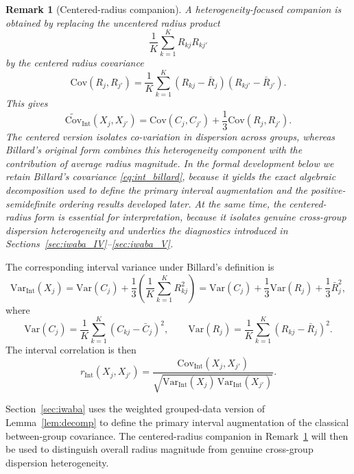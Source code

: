 \documentclass[preprint, times, 12pt, authoryear]{elsarticle}
\newtheorem{remark}{Remark}
\begin{document}
\begin{remark}[Centered-radius companion]\label{rem:routeB}
	A heterogeneity-focused companion is obtained by replacing the uncentered radius product
	\[
	\frac{1}{K}\sum_{k=1}^K R_{kj}R_{kj'}
	\]
	by the centered radius covariance
	\[
	\mathrm{Cov}(R_j,R_{j'})
	=
	\frac{1}{K}\sum_{k=1}^K (R_{kj}-\bar R_j)(R_{kj'}-\bar R_{j'}).
	\]
	This gives
	\begin{equation}\label{eq:int_centered_alt}
		\widetilde{\mathrm{Cov}}_{\mathrm{Int}}(X_j,X_{j'})
		=
		\mathrm{Cov}(C_j,C_{j'})
		+
		\frac{1}{3}\mathrm{Cov}(R_j,R_{j'}).
	\end{equation}
	The centered version isolates co-variation in dispersion across groups, whereas Billard's original form combines this heterogeneity component with the contribution of average radius magnitude. In the formal development below we retain Billard's covariance \eqref{eq:int_billard}, because it yields the exact algebraic decomposition used to define the primary interval augmentation and the positive-semidefinite ordering results developed later. At the same time, the centered-radius form is essential for interpretation, because it isolates genuine cross-group dispersion heterogeneity and underlies the diagnostics introduced in Sections~\ref{sec:iwaba_IV}--\ref{sec:iwaba_V}.
\end{remark}

The corresponding interval variance under Billard's definition is
\begin{equation}\label{eq:int_var}
	\mathrm{Var}_{\mathrm{Int}}(X_j)
	=
	\mathrm{Var}(C_j)
	+
	\frac{1}{3}\left(\frac{1}{K}\sum_{k=1}^K R_{kj}^2\right)
	=
	\mathrm{Var}(C_j)
	+
	\frac{1}{3}\mathrm{Var}(R_j)
	+
	\frac{1}{3}\bar R_j^2,
\end{equation}
where
\begin{equation}\label{eq:center_var}
	\mathrm{Var}(C_j)
	=
	\frac{1}{K}\sum_{k=1}^K (C_{kj}-\bar C_j)^2,
	\qquad
	\mathrm{Var}(R_j)
	=
	\frac{1}{K}\sum_{k=1}^K (R_{kj}-\bar R_j)^2.
\end{equation}
The interval correlation is then
\begin{equation}\label{eq:int_corr}
	r_{\mathrm{Int}}(X_j,X_{j'})
	=
	\frac{\mathrm{Cov}_{\mathrm{Int}}(X_j,X_{j'})}
	{\sqrt{\mathrm{Var}_{\mathrm{Int}}(X_j)\,\mathrm{Var}_{\mathrm{Int}}(X_{j'})}}.
\end{equation}

Section~\ref{sec:iwaba} uses the weighted grouped-data version of Lemma~\ref{lem:decomp} to define the primary interval augmentation of the classical between-group covariance. The centered-radius companion in Remark~\ref{rem:routeB} will then be used to distinguish overall radius magnitude from genuine cross-group dispersion heterogeneity.
\end{document}
